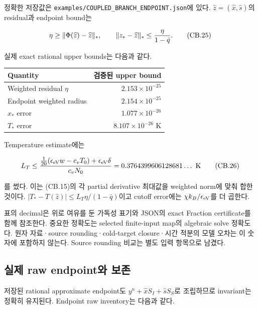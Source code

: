 \documentclass[11pt,a4paper]{article}
\begin{document}
정확한 저장값은 \nolinkurl{examples/COUPLED_BRANCH_ENDPOINT.json}에 있다. \(\widehat z=(\widehat x,\widehat s)\)의 residual과 endpoint bound는

\[
 \eta\ge\|\Phi(\widehat z)-\widehat z\|_*,\qquad
 \|z_*-\widehat z\|_*\le{\eta\over1-\bar q}.
 \tag{CB.25}
\]

실제 exact rational upper bounds는 다음과 같다.

\begin{longtable}[]{@{}lr@{}}
\toprule\noalign{}
Quantity & 검증된 upper bound \\
\midrule\noalign{}
\endhead
\bottomrule\noalign{}
\endlastfoot
Weighted residual \(\eta\) & \(2.153\times10^{-25}\) \\
Endpoint weighted radius & \(2.154\times10^{-25}\) \\
\(x_*\) error & \(1.077\times10^{-26}\) \\
\(T_*\) error & \(8.107\times10^{-26}\) K \\
\end{longtable}

Temperature estimate에는

\[
 L_T\le {\frac1{20}(\epsilon_{\rm eV}w-c_vT_0)
                 +\epsilon_{\rm eV}\delta\over c_vN_0}
      =0.3764399606128681\ldots\ {\rm K}
 \tag{CB.26}
\]

를 썼다. 이는 (CB.15)의 각 partial derivative 최대값을 weighted norm에 맞춰 합한 것이다. \(|T_*-T(\widehat z)|\le L_T\eta/(1-\bar q)\)이고 cutoff error에는 \(\chi k_B/\epsilon_{\rm eV}\)를 더 곱한다.

표의 decimal은 위로 여유를 둔 가독성 표기와 JSON의 exact Fraction certificate를 함께 참조한다. 중요한 정확도는 selected finite-input map의 algebraic solve 정확도다. 원자 자료·source rounding·cold-target closure·시간 적분의 모델 오차는 이 숫자에 포함하지 않는다. Source rounding 비교는 별도 입력 항목으로 남겼다.

\hypertarget{uxc2e4uxc81c-raw-endpointuxc640-uxbcf4uxc874}{%
\subsection{실제 raw endpoint와 보존}\label{uxc2e4uxc81c-raw-endpointuxc640-uxbcf4uxc874}}

저장된 rational approximate endpoint도 \(y^n+\widehat xS_I+\widehat sS_S\)로 조립하므로 invariant는 정확히 유지된다. Endpoint raw inventory는 다음과 같다.
\end{document}
